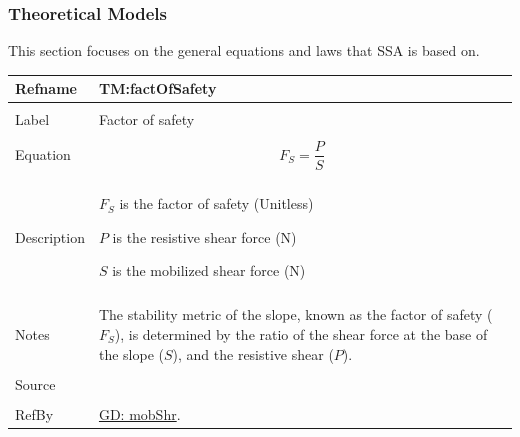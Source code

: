 \documentclass[12pt]{article}
\begin{document}
\subsubsection{Theoretical Models}
\label{Sec:TMs}
This section focuses on the general equations and laws that SSA is based on.
~\newline
 \noindent \begin{minipage}{\textwidth}
\begin{tabular}{p{} p{}}
\toprule \textbf{Refname} & \textbf{TM:factOfSafety}
\label{TM:factOfSafety}
\\ \midrule \\
Label & Factor of safety
        \\ \midrule \\
        Equation & \begin{dmath}
                   {F_{S}}=\frac{P}{S}
                   \end{dmath}
                   \\ \midrule \\
                   Description & \begin{symbDescription}
                                 \item{${F_{S}}$ is the factor of safety (Unitless)}
                                 \item{$P$ is the resistive shear force (N)}
                                 \item{$S$ is the mobilized shear force (N)}
                                 \end{symbDescription}
                                 \\ \midrule \\
                                 Notes & The stability metric of the slope, known as the factor of safety (${F_{S}}$), is determined by the ratio of the shear force at the base of the slope ($S$), and the resistive shear ($P$).
                                         \\ \midrule \\
                                         Source & \cite{fredlund1977}
                                                  \\ \midrule \\
                                                  RefBy & \hyperref[GD:mobShr]{GD: mobShr}.
\\ \bottomrule \end{tabular}
\end{minipage}\\
\end{document}

